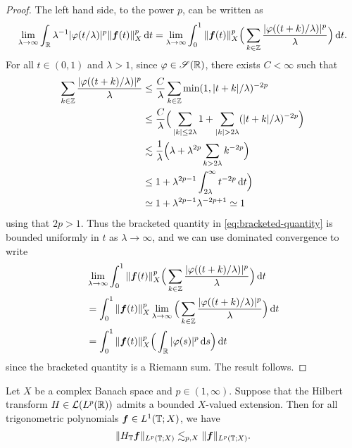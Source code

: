   \begin{proof}
    The left hand side, to the power $p$, can be written as
    \begin{equation}\label{eq:bracketed-quantity}
      \lim_{\lambda \to \infty} \int_{\mathbb{R}} \lambda^{-1}|\varphi(t/\lambda)|^{p} \|\bm{f}(t)\|_{X}^{p} \, \mathrm{d} t
      = \lim_{\lambda \to \infty} \int_{0}^{1} \|\bm{f}(t)\|_{X}^{p} \Big( \sum_{k \in \mathbb{Z}} \frac{|\varphi((t+k)/\lambda)|^{p}}{\lambda} \Big) \, \mathrm{d} t.
  \end{equation}
  For all $t \in (0,1)$ and $\lambda > 1$, since $\varphi \in \mathscr{S}(\mathbb{R})$, there exists $C < \infty$ such that
  \begin{equation*}
    \begin{aligned}
      \sum_{k \in \mathbb{Z}} \frac{|\varphi((t+k)/\lambda)|^{p}}{\lambda}
      &\leq \frac{C}{\lambda} \sum_{k \in \mathbb{Z}} \min(1,|t+k|/\lambda)^{-2p} \\
      &\leq \frac{C}{\lambda} \Big( \sum_{|k| \leq 2\lambda} 1 + \sum_{|k| > 2\lambda}  (|t+k|/\lambda)^{-2p} \Big) \\
      &\lesssim \frac{1}{\lambda} \Big( \lambda + \lambda^{2p} \sum_{k > 2\lambda} k^{-2p} \Big) \\
      &\leq 1 + \lambda^{2p-1} \int_{2\lambda}^\infty t^{-2p} \, \mathrm{d} t \Big) \\
      &\simeq 1 + \lambda^{2p-1} \lambda^{-2p+1} \simeq 1
    \end{aligned}
  \end{equation*}
  using that $2p > 1$.
  Thus the bracketed quantity in \eqref{eq:bracketed-quantity} is bounded uniformly in $t$ as $\lambda \to \infty$, and we can use dominated convergence to write
  \begin{equation*}
    \begin{aligned}
      &\lim_{\lambda \to \infty} \int_{0}^{1} \|\bm{f}(t)\|_{X}^{p} \Big( \sum_{k \in \mathbb{Z}} \frac{|\varphi((t+k)/\lambda)|^{p}}{\lambda} \Big) \, \mathrm{d} t \\
      &= \int_{0}^{1} \|\bm{f}(t)\|_{X}^{p} \lim_{\lambda \to \infty} \Big( \sum_{k \in \mathbb{Z}} \frac{|\varphi((t+k)/\lambda)|^{p}}{\lambda} \Big) \, \mathrm{d} t \\
      &= \int_{0}^{1} \|\bm{f}(t)\|_{X}^{p} \Big( \int_{\mathbb{R}} |\varphi(s)|^{p} \, \mathrm{d} s\Big) \, \mathrm{d} t
    \end{aligned}
  \end{equation*}
  since the bracketed quantity is a Riemann sum.
  The result follows.
  \end{proof}

  \begin{prop}\label{prop:UMD-HTT}
    Let $X$ be a complex Banach space and $p \in (1,\infty)$.
    Suppose that the Hilbert transform $H \in \mathcal{L}(L^p(\mathbb{R}))$ admits a bounded $X$-valued extension.
    Then for all trigonometric polynomials $\bm{f} \in L^1(\mathbb{T};X)$, we have
    \begin{equation*}
      \|H_{\mathbb{T}} \bm{f}\|_{L^p(\mathbb{T};X)} \lesssim_{p,X} \|\bm{f}\|_{L^p(\mathbb{T};X)}.
    \end{equation*}
  \end{prop}
  
